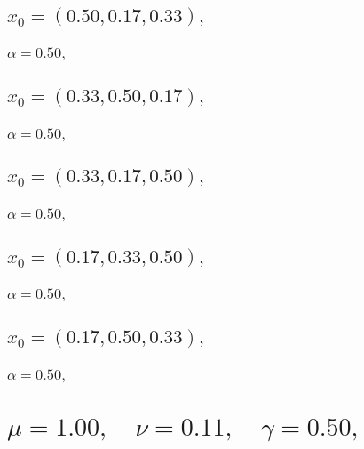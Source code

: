 \documentclass[a4paper]{article}
\begin{document}
\begin{multicols*}{2}
   \subsection{\(x_0 = (0.50,0.17,0.33),\quad \)}
   

   \subsubsection{\(\alpha = 0.50,\quad \)}
   

   \subsection{\(x_0 = (0.33,0.50,0.17),\quad \)}
   

   \subsubsection{\(\alpha = 0.50,\quad \)}
   

   \subsection{\(x_0 = (0.33,0.17,0.50),\quad \)}
   

   \subsubsection{\(\alpha = 0.50,\quad \)}
   

   \subsection{\(x_0 = (0.17,0.33,0.50),\quad \)}
   

   \subsubsection{\(\alpha = 0.50,\quad \)}
   

   \subsection{\(x_0 = (0.17,0.50,0.33),\quad \)}
   

   \subsubsection{\(\alpha = 0.50,\quad \)}
   

   \section{\(\mu = 1.00,\quad \nu = 0.11,\quad \gamma = 0.50,\quad \)}
   


\end{multicols*}
\end{document}
